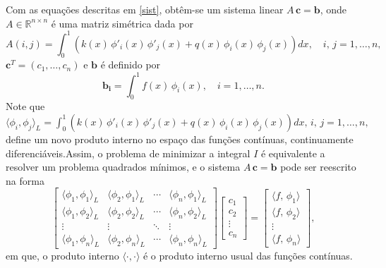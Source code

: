 \documentclass[12pt,a4paper]{report}
\newcommand{\dis}{\displaystyle}
\newcommand{\R}{\mathbb{R}}
\begin{document}
Com as equações descritas em \eqref{sist}, obtêm-se um sistema linear $A\,\mathbf{c} = \mathbf{b}$, onde $A\in\R^{n\times n}$ é uma matriz simétrica dada por
\begin{equation*}
A(i,j) = \dis\int_0^1 (k(x)\,\phi'_i(x)\,\phi'_j(x) + q(x)\,\phi_i(x)\,\phi_j(x))dx, \quad i,\,j = 1,\dots,n,
\end{equation*}
$\mathbf{c}^T=(c_1,\dots,c_n)$ e $\mathbf{b}$ é definido por
\begin{equation*}
\mathbf{b_i} =\dis\int_0^1f(x)\,\phi_i(x), \quad i = 1,\dots,n. 
\end{equation*}
Note que $\langle \phi_i,\phi_j\rangle _L = \dis\int_0^1 (k(x)\,\phi'_i(x)\,\phi'_j(x) + q(x)\,\phi_i(x)\,\phi_j(x))dx, \,i,\,j = 1,\dots,n,$ define um novo produto interno no espaço das funções contínuas, continuamente diferenciáveis.Assim, o problema de minimizar a integral $I$ é equivalente a resolver um problema quadrados mínimos, e o sistema $A\,\mathbf{c}=\mathbf{b}$ pode ser reescrito na forma
\begin{equation}\label{mmq}
\begin{bmatrix}
\langle \phi_1,\phi_1\rangle _L & \langle \phi_2,\phi_1\rangle _L & \cdots & \langle \phi_n,\phi_1\rangle _L\\
\langle \phi_1,\phi_2\rangle _L & \langle \phi_2,\phi_2\rangle _L & \cdots & \langle \phi_n,\phi_2\rangle _L\\
\vdots &  \vdots & \ddots & \vdots\\
\langle \phi_1,\phi_n\rangle _L & \langle \phi_2,\phi_n\rangle _L & \cdots & \langle \phi_n,\phi_n\rangle _L
\end{bmatrix}
\begin{bmatrix}
c_1\\
c_2\\
\vdots\\
c_n
\end{bmatrix}=
\begin{bmatrix}
\langle f,\,\phi_1\rangle\\
\langle f,\,\phi_2\rangle\\
\vdots\\
\langle f,\,\phi_n\rangle
\end{bmatrix},
\end{equation}
em que, o produto interno $\langle \cdot,\cdot\rangle$ é o produto interno usual das funções contínuas.
\end{document}
